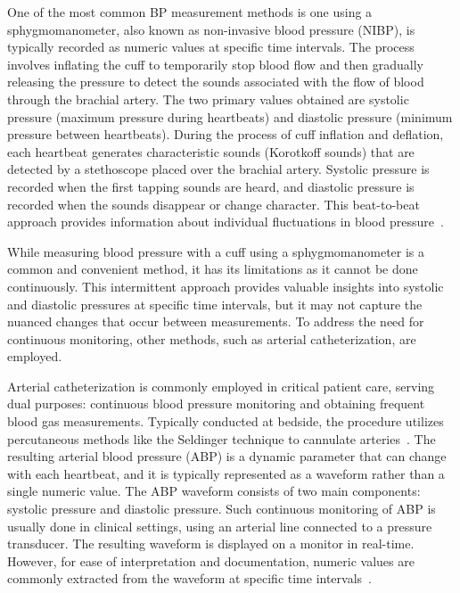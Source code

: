 One of the most common BP measurement methods is one using a sphygmomanometer, also known as non-invasive blood pressure (NIBP), is typically recorded as numeric values at specific time intervals.
The process involves inflating the cuff to temporarily stop blood flow and then gradually releasing the pressure to detect the sounds associated with the flow of blood through the brachial artery.
The two primary values obtained are systolic pressure (maximum pressure during heartbeats) and diastolic pressure (minimum pressure between heartbeats).
During the process of cuff inflation and deflation, each heartbeat generates characteristic sounds (Korotkoff sounds) that are detected by a stethoscope placed over the brachial artery.
Systolic pressure is recorded when the first tapping sounds are heard, and diastolic pressure is recorded when the sounds disappear or change character.
This beat-to-beat approach provides information about individual fluctuations in blood pressure~\cite{betts20BloodFlow2022}.

While measuring blood pressure with a cuff using a sphygmomanometer is a common and convenient method, it has its limitations as it cannot be done continuously.
This intermittent approach provides valuable insights into systolic and diastolic pressures at specific time intervals, but it may not capture the nuanced changes that occur between measurements.
To address the need for continuous monitoring, other methods, such as arterial catheterization, are employed.

Arterial catheterization is commonly employed in critical patient care, serving dual purposes: continuous blood pressure monitoring and obtaining frequent blood gas measurements.
Typically conducted at bedside, the procedure utilizes percutaneous methods like the Seldinger technique to cannulate arteries~\cite{clarkArterialCatheterization1992}.
The resulting arterial blood pressure (ABP) is a dynamic parameter that can change with each heartbeat, and it is typically represented as a waveform rather than a single numeric value.
The ABP waveform consists of two main components: systolic pressure and diastolic pressure.
Such continuous monitoring of ABP is usually done in clinical settings, using an arterial line connected to a pressure transducer.
The resulting waveform is displayed on a monitor in real-time.
However, for ease of interpretation and documentation, numeric values are commonly extracted from the waveform at specific time intervals~\cite{hillImputationContinuousArterial2021}.

